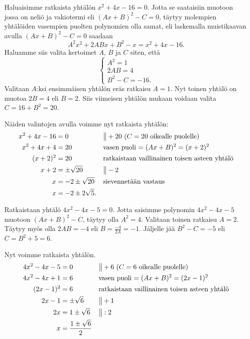 \begin{esimerkki}
Haluaisimme ratkaista yhtälön $x^2+4x-16 = 0$. Jotta se saataisiin muotoon
jossa on neliö ja vakiotermi eli $(Ax+B)^2-C=0$, täytyy molempien yhtälöiden
vasempien puolten polynomien olla samat, eli laskemalla muistikaavan avulla
$(Ax+B)^2-C=0$ saadaan
\[A^2x^2+2ABx+B^2-x=x^2+4x-16.\]
Haluamme siis valita kertoimet $A$, $B$ ja $C$ siten, että
\[\left\{\begin{array}{l}
A^2=1 \\ 2AB=4 \\ B^2-C=-16.
\end{array}\right.\]
Valitaan $A$:ksi ensimmäisen yhtälön eräs ratkaisu $A = 1$. Nyt toinen yhtälö
on muotoa $2B=4$ eli $B = 2$. Siis viimeisen yhtälön mukaan voidaan valita
$C = 16+B^2 = 20$.

Näiden valintojen avulla voimme nyt ratkaista yhtälön:
\begin{align*}
x^2+4x-16 &= 0 &&\big\| + 20 \text{ ($C = 20$ oikealle puolelle)} \\
x^2+4x+4 &= 20 &&\text{vasen puoli $ = (Ax+B)^2 = (x+2)^2$} \\
(x+2)^2 &= 20 &&\text{ratkaistaan vaillinainen toisen asteen yhtälö} \\
x+2 &= \pm \sqrt{20} &&\big\| - 2 \\
x &= -2 \pm \sqrt{20} &&\text{sievennetään vastaus} \\
x &= -2 \pm 2\sqrt{5}.
\end{align*}
\end{esimerkki}

\begin{esimerkki}
Ratkaistaan yhtälö $4x^2-4x-5=0$. Jotta saisimme polynomin $4x^2-4x-5$ muotoon
$(Ax+B)^2-C$, täytyy olla $A^2 = 4$. Valitaan toinen ratkaisu $A = 2$. Täytyy
myös olla $2AB = -4$ eli $B=\frac{-4}{2A}=-1$. Jäljelle jää $B^2 - C = -5$ eli
$C = B^2+5 = 6$.

Nyt voimme ratkaista yhtälön.
\begin{align*}
4x^2-4x-5 &= 0 &&\big\| + 6 \text{ ($C = 6$ oikealle puolelle)} \\
4x^2-4x+1 &= 6 &&\text{vasen puoli $ = (Ax+B)^2 = (2x-1)^2$} \\
(2x-1)^2 &= 6 &&\text{ratkaistaan vaillinainen toisen asteen yhtälö} \\
2x-1 &= \pm \sqrt{6} &&\big\| + 1 \\
2x &= 1 \pm \sqrt{6} &&\big\| : 2 \\
x &= \frac{1\pm \sqrt{6}}{2}
\end{align*}
\end{esimerkki}

